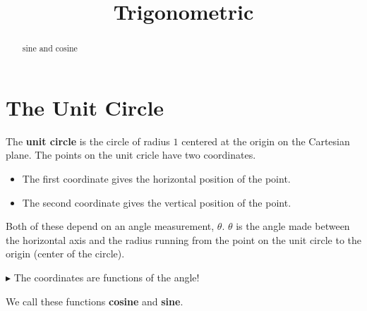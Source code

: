 \documentclass{ximera}
\title{Trigonometric}
\begin{document}
\begin{abstract}
sine and cosine
\end{abstract}
\maketitle















\section{The Unit Circle}


The \textbf{unit circle} is the circle of radius $1$ centered at the origin on the Cartesian plane. The points on the unit cricle have two coordinates.  

\begin{itemize}
\item The first coordinate gives the horizontal position of the point. 
\item The second coordinate gives the vertical position of the point.  
\end{itemize}

Both of these depend on an angle measurement, $\theta$. $\theta$ is the angle made between the horizontal axis and the radius running from the point on the unit circle to the origin (center of the circle).


\textbf{\textcolor{red!90!darkgray}{$\blacktriangleright$}}  The coordinates are functions of the angle!

We call these functions \textbf{cosine} and \textbf{sine}.
\end{document}
